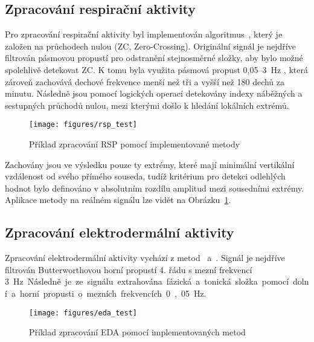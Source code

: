 \subsection{Zpracování respirační aktivity}
\label{subsec:zpracovani_rsp}
Pro zpracování respirační aktivity byl implementován
algoritmus~\cite{Khodadad2018}, který je založen na průchodech nulou (\gls{ZC},
Zero-Crossing). Originální signál je nejdříve filtrován pásmovou propustí pro
odstranění stejnosměrné složky, aby bylo možné spolehlivě detekovat \gls{ZC}. K
tomu byla využita pásmová propust 0,05--3~Hz , která zároveň zachovává dechové
frekvence menší než tři a vyšší než 180 dechů za minutu. Následně jsou pomocí
logických operací detekovány indexy náběžných a sestupných průchodů nulou, mezi
kterými došlo k hledání lokálních extrémů.

\begin{figure}[h]
    \begin{center}
        \texttt{[image: figures/rsp\_test]}
        \caption{Příklad zpracování RSP pomocí implementované metody}
        \label{fig:rsp_test}
    \end{center}
\end{figure}

Zachovány jsou ve výsledku pouze ty extrémy, které mají minimální vertikální
vzdálenost od svého přímého souseda, tudíž kritérium pro detekci odlehlých
hodnot bylo definováno v absolutním rozdílu amplitud mezi sousedními extrémy.
Aplikace metody na reálném signálu lze vidět na Obrázku~\ref{fig:rsp_test}.

\subsection{Zpracování elektrodermální aktivity}
\label{subsec:zpracovani_eda}
Zpracování elektrodermální aktivity vychází z metod~\cite{vanhalem2020}
a~\cite{posada2016}. Signál je nejdříve filtrován Butterworthovou horní propustí
4. řádu s mezní frekvencí 3~\si\Hz. Následně je ze signálu extrahována fázická a
tonická složka pomocí dolní a horní propusti o mezních frekvencích 0,05~\si\Hz.

\begin{figure}[h]
    \begin{center}
        \texttt{[image: figures/eda\_test]}
        \caption{Příklad zpracování EDA pomocí implementovaných metod}
        \label{fig:eda_test}
    \end{center}
\end{figure}

